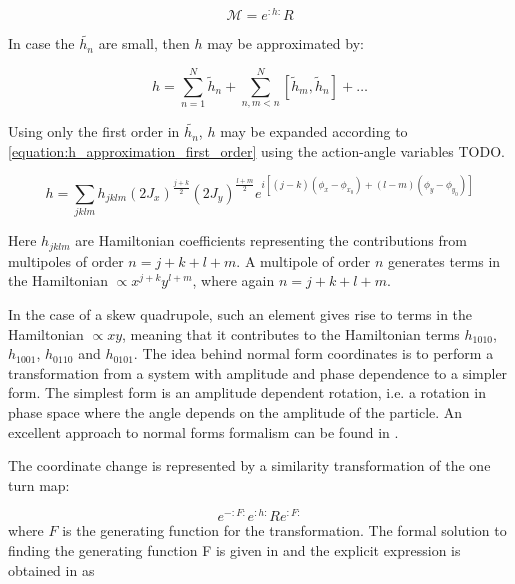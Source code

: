 \begin{equation}
    \mathcal{M} = e^{:h:} R
\end{equation}

In case the \(\tilde{h_{n}}\) are small, then \(h\) may be approximated by:

\begin{equation}
    h = \sum_{n=1}^{N} \tilde{h}_{n} + \sum_{n, m<n}^{N} \left[\tilde{h}_{m}, \tilde{h}_{n} \right] + \ldots
    \label{equation:h_expansion}
\end{equation}

Using only the first order in \(\tilde{h_{n}}\), \(h\) may be expanded according to \cref{equation:h_approximation_first_order} using the action-angle variables TODO.

\begin{equation}
    h = \sum_{j k l m} h_{j k l m} \left(2 J_{x}\right)^{\frac{j+k}{2}} \left(2 J_{y}\right)^{\frac{l+m}{2}} e^{i \left[(j-k)\left(\phi_{x}-\phi_{x_{0}}\right) + (l-m)\left(\phi_{y}-\phi_{y_{0}}\right) \right]}
    \label{equation:h_approximation_first_order}
\end{equation}

Here \(h_{j k l m}\) are Hamiltonian coefficients representing the contributions from multipoles of order \(n = j + k + l + m\).
A multipole of order \(n\) generates terms in the Hamiltonian \(\propto x^{j+k} y^{l+m}\), where again \(n = j + k + l + m\).

In the case of a skew quadrupole, such an element gives rise to terms in the Hamiltonian \(\propto xy\), meaning that it contributes to the Hamiltonian terms \(h_{1010}\), \(h_{1001}\), \(h_{0110}\) and \(h_{0101}\).
The idea behind normal form coordinates is to perform a transformation from a system with amplitude and phase dependence to a simpler form.
The simplest form is an amplitude dependent rotation, i.e. a rotation in phase space where the angle depends on the amplitude of the particle.
An excellent approach to normal forms formalism can be found in \cite{Carlier_thesis}.

The coordinate change is represented by a similarity transformation of the one turn map:

\begin{equation}
    e^{-: F:} e^{: h:} R e^{: F:}
\end{equation}
where \(F\) is the generating function for the transformation.
The formal solution to finding the generating function F is given in \cite{Forest_normal_forms} and the explicit expression is obtained in \cite{Tomas_thesis} as

